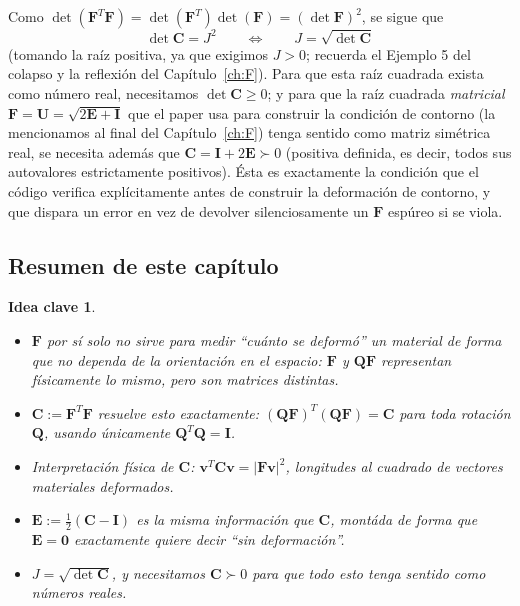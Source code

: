 \documentclass[11pt,a4paper]{article}
\newtheorem{takeaway}{Idea clave}
\begin{document}
Como $\det(\bm F^T\bm F)=\det(\bm F^T)\det(\bm F)=(\det\bm F)^2$, se
sigue que
\begin{equation}
 \det\bm C = J^2 \qquad\Longleftrightarrow\qquad J=\sqrt{\det\bm C}
 \label{eq:appB-J-C}
\end{equation}
(tomando la ra\'iz positiva, ya que exigimos $J>0$; recuerda el
Ejemplo 5 del colapso y la reflexi\'on del Cap\'itulo~\ref{ch:F}). Para
que esta ra\'iz cuadrada exista como n\'umero real, necesitamos
$\det\bm C\geq0$; y para que la ra\'iz cuadrada \emph{matricial}
$\bm F=\bm U=\sqrt{2\bm E+\bm I}$ que el paper usa para construir la
condici\'on de contorno (la mencionamos al final del
Cap\'itulo~\ref{ch:F}) tenga sentido como matriz sim\'etrica real, se
necesita adem\'as que $\bm C=\bm I+2\bm E\succ0$ (positiva definida,
es decir, todos sus autovalores estrictamente positivos). \'Esta es
exactamente la condici\'on que el c\'odigo verifica expl\'icitamente
antes de construir la deformaci\'on de contorno, y que dispara un
error en vez de devolver silenciosamente un $\bm F$ esp\'ureo si se
viola.

\subsection{Resumen de este cap\'itulo}

\begin{takeaway}
\begin{itemize}
\item $\bm F$ por s\'i solo no sirve para medir ``cu\'anto se
deform\'o'' un material de forma que no dependa de la orientaci\'on en
el espacio: $\bm F$ y $\bm Q\bm F$ representan f\'isicamente lo mismo,
pero son matrices distintas.
\item $\bm C:=\bm F^T\bm F$ resuelve esto exactamente:
$(\bm Q\bm F)^T(\bm Q\bm F)=\bm C$ para toda rotaci\'on $\bm Q$,
usando \'unicamente $\bm Q^T\bm Q=\bm I$.
\item Interpretaci\'on f\'isica de $\bm C$: $\bm v^T\bm C\bm v=|\bm F\bm v|^2$,
longitudes al cuadrado de vectores materiales deformados.
\item $\bm E:=\tfrac12(\bm C-\bm I)$ es la misma informaci\'on que
$\bm C$, mont\'ada de forma que $\bm E=\bm 0$ exactamente quiere decir
``sin deformaci\'on''.
\item $J=\sqrt{\det\bm C}$, y necesitamos $\bm C\succ0$ para que todo
esto tenga sentido como n\'umeros reales.
\end{itemize}
\end{takeaway}
\end{document}
